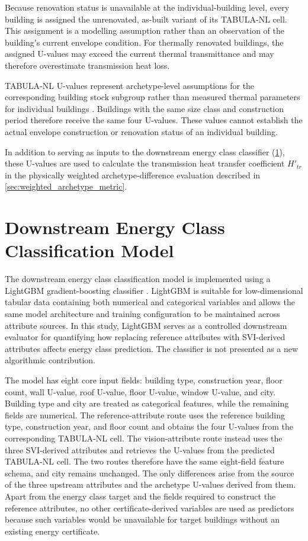 Because renovation status is unavailable at the individual-building level, every building is assigned the unrenovated, as-built variant of its TABULA-NL cell.
This assignment is a modelling assumption rather than an observation of the building's current envelope condition.
For thermally renovated buildings, the assigned U-values may exceed the current thermal transmittance and may therefore overestimate transmission heat loss.

TABULA-NL U-values represent archetype-level assumptions for the corresponding building stock subgroup rather than measured thermal parameters for individual buildings \parencite{loga2016}.
Buildings with the same size class and construction period therefore receive the same four U-values.
These values cannot establish the actual envelope construction or renovation status of an individual building.

In addition to serving as inputs to the downstream energy class classifier (\cref{sec:downstream_model}), these U-values are used to calculate the transmission heat transfer coefficient $H'_{tr}$ in the physically weighted archetype-difference evaluation described in \cref{sec:weighted_archetype_metric}.

\section{Downstream Energy Class Classification Model}
\label{sec:downstream_model}

The downstream energy class classification model is implemented using a LightGBM gradient-boosting classifier \parencite{ke2017}.
LightGBM is suitable for low-dimensional tabular data containing both numerical and categorical variables and allows the same model architecture and training configuration to be maintained across attribute sources.
In this study, LightGBM serves as a controlled downstream evaluator for quantifying how replacing reference attributes with \ac{SVI}-derived attributes affects energy class prediction.
The classifier is not presented as a new algorithmic contribution.

The model has eight core input fields: building type, construction year, floor count, wall U-value, roof U-value, floor U-value, window U-value, and city.
Building type and city are treated as categorical features, while the remaining fields are numerical.
The reference-attribute route uses the reference building type, construction year, and floor count and obtains the four U-values from the corresponding TABULA-NL cell.
The vision-attribute route instead uses the three \ac{SVI}-derived attributes and retrieves the U-values from the predicted TABULA-NL cell.
The two routes therefore have the same eight-field feature schema, and city remains unchanged.
The only differences arise from the source of the three upstream attributes and the archetype U-values derived from them.
Apart from the energy class target and the fields required to construct the reference attributes, no other certificate-derived variables are used as predictors because such variables would be unavailable for target buildings without an existing energy certificate.

